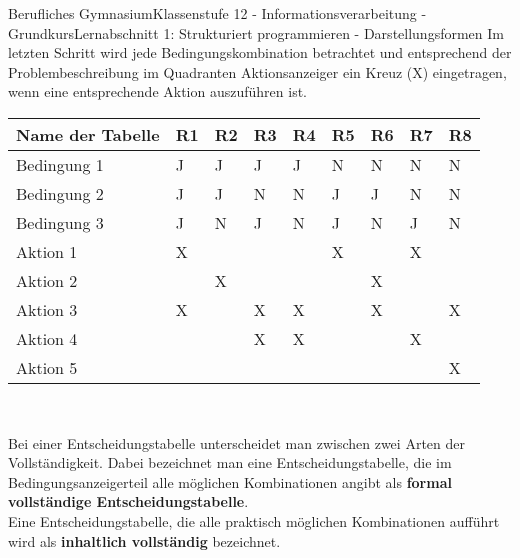 \documentclass[11pt,oneside,openany,headings=optiontotoc,11pt,numbers=noenddot]{article}
\begin{document}
\begin{worksheet}{Berufliches Gymnasium}{Klassenstufe 12 - Informationsverarbeitung - Grundkurs}{Lernabschnitt 1: Strukturiert programmieren - Darstellungsformen}
		Im letzten Schritt wird jede Bedingungskombination betrachtet und entsprechend der Problembeschreibung im Quadranten \grqq{}Aktionsanzeiger\grqq{} ein Kreuz (X) eingetragen, wenn eine entsprechende Aktion auszuführen ist.\\
		\par\noindent
		\begin{tabularx}{\textwidth}{|l||M|M|M|M|M|M|M|M|}
			\hline
			\textbf{Name der Tabelle} & \textbf{R1} & \textbf{R2} & \textbf{R3} & \textbf{R4} & \textbf{R5} & \textbf{R6} & \textbf{R7} & \textbf{R8}\\
			\hline
			Bedingung 1 & J & J & J & J & N & N & N & N\\
			\hline
			Bedingung 2 & J & J & N & N & J & J & N & N\\
			\hline
			Bedingung 3 & J & N & J & N & J & N & J & N\\
			\hline
			\hline
			Aktion 1 & X & & & & X & & X & \\
			\hline
			Aktion 2 & & X & & & & X & & \\
			\hline
			Aktion 3 & X & & X & X & & X & & X\\
			\hline
			Aktion 4 & & & X & X & & & X & \\
			\hline
			Aktion 5 & & & & & & & & X\\
			\hline
		\end{tabularx}\\
		\par\noindent
		Bei einer Entscheidungstabelle unterscheidet man zwischen zwei Arten der Vollständigkeit. Dabei bezeichnet man eine Entscheidungstabelle, die im Bedingungsanzeigerteil alle möglichen Kombinationen angibt als \textbf{formal vollständige Entscheidungstabelle}.\\
		Eine Entscheidungstabelle, die alle praktisch möglichen Kombinationen aufführt wird als \textbf{inhaltlich vollständig} bezeichnet.\\

\end{worksheet}
\end{document}
